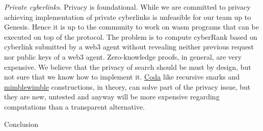 \documentclass[10pt,oneside]{amsart}
\makeatletter
\def\section{\@startsection{section}{1}%
  \z@{.7\linespacing\@plus\linespacing}{.5\linespacing}%
  {\normalfont\scshape}}%
\makeatother
\begin{document}
\textit{Private cyberlinks}. Privacy is foundational. While we are committed to privacy achieving implementation of private cyberlinks is unfeasible for our team up to Genesis. Hence it is up to the community to work on wasm programs that can be executed on top of the protocol. The problem is to compute cyberRank based on cyberlink submitted by a web3 agent without revealing neither previous request nor public keys of a web3 agent. Zero-knowledge proofs, in general, are very expensive. We believe that the privacy of search should be must by design, but not sure that we know how to implement it. \href{https://ipfs.io/ipfs/Qmdje3AmtsfjX9edWAxo3LFhV9CTAXoUvwGR7wHJXnc2Gk}{Coda} like recursive snarks and \href{https://ipfs.io/ipfs/Qmd99xmraYip9cVv8gRMy6Y97Bkij8qUYArGDME7CzFasg}{mimblewimble} constructions, in theory, can solve part of the privacy issue, but they are new, untested and anyway will be more expensive regarding computations than a transparent alternative.

\section{Conclusion}\label{Conclusion}
\end{document}
